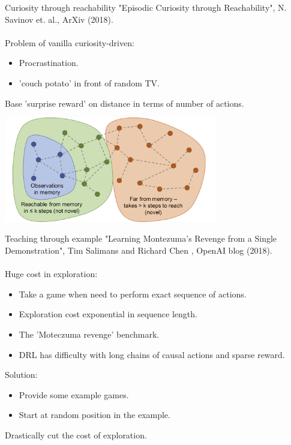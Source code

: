 \documentclass{beamer}
\begin{document}
\begin{frame}{Curiosity through reachability}
"Episodic Curiosity through Reachability", N. Savinov et. al., ArXiv (2018). \\~\\

    Problem of vanilla curiosity-driven:
    \begin{itemize}
        \item Procrastination.
        \item 'couch potato' in front of random TV.
    \end{itemize}

    \begin{center}
        Base 'surprise reward' on distance in terms of number of actions.
    \end{center}

    \begin{center}
    \includegraphics[width=0.70\textwidth]{Figures/curiosity_reachability}
    \end{center}
\end{frame}

\begin{frame}{Teaching through example}
"Learning Montezuma's Revenge from a Single Demonstration",  Tim Salimans and Richard Chen , OpenAI blog (2018). \\~\\

    Huge cost in exploration:
    \begin{itemize}
        \item Take a game when need to perform exact sequence of actions.
        \item Exploration cost exponential in sequence length.
        \item The 'Moteczuma revenge' benchmark.
        \item DRL has difficulty with long chains of causal actions and sparse reward.
    \end{itemize}

    Solution:
    \begin{itemize}
        \item Provide some example games.
        \item Start at random position in the example.
    \end{itemize}

    Drastically cut the cost of exploration.
\end{frame}
\end{document}

